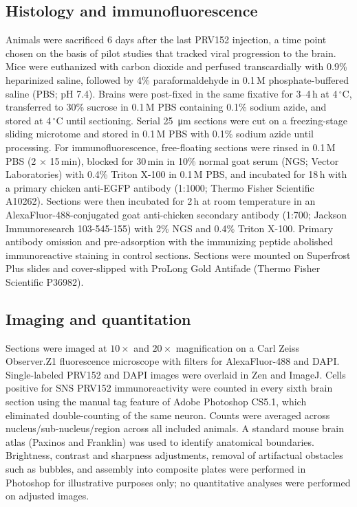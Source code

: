 \documentclass[11pt]{article}
\begin{document}
\subsection{Histology and immunofluorescence}
Animals were sacrificed 6 days after the last PRV152 injection, a time point chosen on the basis of pilot studies that tracked viral progression to the brain. Mice were euthanized with carbon dioxide and perfused transcardially with 0.9\% heparinized saline, followed by 4\% paraformaldehyde in 0.1\,M phosphate-buffered saline (PBS; pH 7.4). Brains were post-fixed in the same fixative for 3--4\,h at 4\,$^\circ$C, transferred to 30\% sucrose in 0.1\,M PBS containing 0.1\% sodium azide, and stored at 4\,$^\circ$C until sectioning. Serial \SI{25}{\micro\metre} sections were cut on a freezing-stage sliding microtome and stored in 0.1\,M PBS with 0.1\% sodium azide until processing. For immunofluorescence, free-floating sections were rinsed in 0.1\,M PBS (2 $\times$ 15\,min), blocked for 30\,min in 10\% normal goat serum (NGS; Vector Laboratories) with 0.4\% Triton X-100 in 0.1\,M PBS, and incubated for 18\,h with a primary chicken anti-EGFP antibody (1:1000; Thermo Fisher Scientific A10262). Sections were then incubated for 2\,h at room temperature in an AlexaFluor-488-conjugated goat anti-chicken secondary antibody (1:700; Jackson Immunoresearch 103-545-155) with 2\% NGS and 0.4\% Triton X-100. Primary antibody omission and pre-adsorption with the immunizing peptide abolished immunoreactive staining in control sections. Sections were mounted on Superfrost Plus slides and cover-slipped with ProLong Gold Antifade (Thermo Fisher Scientific P36982).

\subsection{Imaging and quantitation}
Sections were imaged at $10\times$ and $20\times$ magnification on a Carl Zeiss Observer.Z1 fluorescence microscope with filters for AlexaFluor-488 and DAPI. Single-labeled PRV152 and DAPI images were overlaid in Zen and ImageJ. Cells positive for SNS PRV152 immunoreactivity were counted in every sixth brain section using the manual tag feature of Adobe Photoshop CS5.1, which eliminated double-counting of the same neuron. Counts were averaged across nucleus/sub-nucleus/region across all included animals. A standard mouse brain atlas (Paxinos and Franklin) was used to identify anatomical boundaries. Brightness, contrast and sharpness adjustments, removal of artifactual obstacles such as bubbles, and assembly into composite plates were performed in Photoshop for illustrative purposes only; no quantitative analyses were performed on adjusted images.
\end{document}
